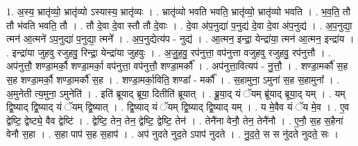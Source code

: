 \documentclass[17pt]{extarticle}
\begin{document}
1. अ॒स्य॒ भ्रातृ॑व्यो॒ भ्रातृ॑व्यो ऽस्यास्य॒ भ्रातृ॑व्यः । . भ्रातृ॑व्यो भवति भवति॒ भ्रातृ॑व्यो॒ भ्रातृ॑व्यो भवति । . भ॒व॒ति॒ तौ तौ भ॑वति भवति॒ तौ । . तौ दे॒वा दे॒वा स्तौ तौ दे॒वाः । . दे॒वा अ॑प॒नुद्या॑ प॒नुद्य॑ दे॒वा दे॒वा अ॑प॒नुद्य॑ । . अ॒प॒नुद्या॒ त्मन॑ आ॒त्मने॑ ऽप॒नुद्या॑ प॒नुद्या॒ त्मने᳚ । . अ॒प॒नुद्येत्य॑प - नुद्य॑ । . आ॒त्मन॒ इन्द्रा॒ येन्द्रा॑या॒ त्मन॑ आ॒त्मन॒ इन्द्रा॑य । . इन्द्रा॑या जुहवु रजुहवु॒ रिन्द्रा॒ येन्द्रा॑या जुहवुः । . अ॒जु॒ह॒वु॒ रप॑नुत्ता॒ वप॑नुत्ता वजुहवु रजुहवु॒ रप॑नुत्तौ । . अप॑नुत्तौ॒ शण्डा॒मर्कौ॒ शण्डा॒मर्का॒ वप॑नुत्ता॒ वप॑नुत्तौ॒ शण्डा॒मर्कौ᳚ । . अप॑नुत्ता॒वित्यप॑ - नु॒त्तौ॒ । . शण्डा॒मर्कौ॑ स॒ह स॒ह शण्डा॒मर्कौ॒ शण्डा॒मर्कौ॑ स॒ह । . शण्डा॒मर्का॒विति॒ शण्डा᳚ - मर्कौ᳚ । . स॒हामुना॒ ऽमुना॑ स॒ह स॒हामुना᳚ । . अ॒मुनेती त्य॒मुना॒ ऽमुनेति॑ । . इति॑ ब्रूयाद् ब्रूया॒ दितीति॑ ब्रूयात् । . ब्रू॒या॒द् यं ॅयम् ब्रू॑याद् ब्रूया॒द् यम् । . यम् द्वि॒ष्याद् द्वि॒ष्याद् यं ॅयम् द्वि॒ष्यात् । . द्वि॒ष्याद् यं ॅयम् द्वि॒ष्याद् द्वि॒ष्याद् यम् । . य मे॒वैव यं ॅय मे॒व । . ए॒व द्वेष्टि॒ द्वेष्ट्ये॒ वैव द्वेष्टि॑ । . द्वेष्टि॒ तेन॒ तेन॒ द्वेष्टि॒ द्वेष्टि॒ तेन॑ । . तेनै॑ना वेनौ॒ तेन॒ तेनै॑नौ । . ए॒नौ॒ स॒ह स॒हैना॑ वेनौ स॒हा । . स॒हा पाप॑ स॒ह स॒हाप॑ । . अप॑ नुदते नुद॒ते ऽपाप॑ नुदते । . नु॒द॒ते॒ स स नु॑दते नुदते॒ सः । \newline
\end{document}
